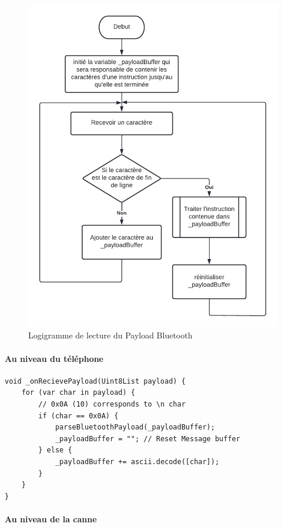 \begin{figure}[!htbp]
    \centering
    \includegraphics[width=.7\linewidth]{assets/bluetooth/read payload.png}
    \caption{Logigramme de lecture du Payload Bluetooth}
\end{figure}

\FloatBarrier

\paragraph{Au niveau du téléphone}

\begin{code}
\begin{verbatim}
void _onRecievePayload(Uint8List payload) {
    for (var char in payload) {
        // 0x0A (10) corresponds to \n char
        if (char == 0x0A) {
            parseBluetoothPayload(_payloadBuffer);
            _payloadBuffer = ""; // Reset Message buffer
        } else {
            _payloadBuffer += ascii.decode([char]);
        }
    }
}    
\end{verbatim}
\caption{Lecture du Payload Bluetooth au niveau de l'application mobile}
\end{code}

\paragraph{Au niveau de la canne}

